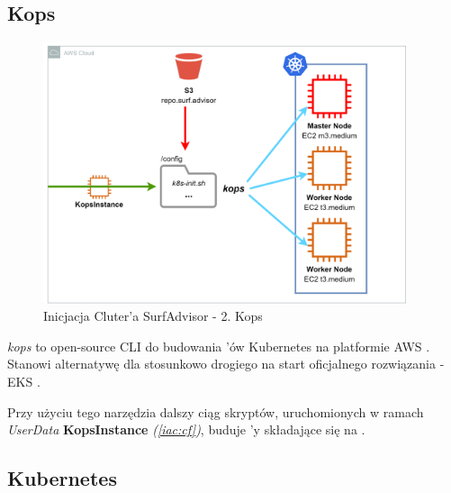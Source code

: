 \subsection{Kops}
\label{iac:kops}

\begin{figure}[!ht]
	\begin{center}
		\includegraphics[width=0.95\textwidth]{img/IAC-step2}
	\end{center}
	\caption{Inicjacja Cluter'a SurfAdvisor - 2. Kops}
\end{figure}

\emph{kops} to open-source CLI do budowania 'ów Kubernetes na platformie AWS \cite{kops-k8s}.
Stanowi alternatywę dla stosunkowo drogiego na start oficjalnego rozwiązania - EKS \cite{eks-pricing}.

Przy użyciu tego narzędzia dalszy ciąg skryptów, uruchomionych w ramach \emph{UserData} \textbf{KopsInstance} \emph{(\ref{iac:cf})}, buduje 'y składające się na .


\subsection{Kubernetes}
\label{iac:kubectl}

